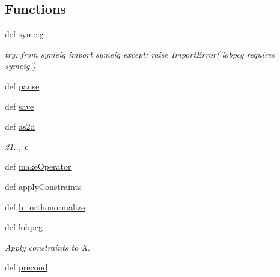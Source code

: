 \subsection*{Functions}
\begin{DoxyCompactItemize}
\item 
def \hyperlink{namespacescipy_1_1sparse_1_1linalg_1_1eigen_1_1lobpcg_1_1lobpcg_aa183ec0063fd295253ce902985b21e04}{symeig}
\begin{DoxyCompactList}\small\item\em try\+: from symeig import symeig except\+: raise Import\+Error('lobpcg requires symeig') \end{DoxyCompactList}\item 
def \hyperlink{namespacescipy_1_1sparse_1_1linalg_1_1eigen_1_1lobpcg_1_1lobpcg_aa94b494b714317896c7dcd451e185f98}{pause}
\item 
def \hyperlink{namespacescipy_1_1sparse_1_1linalg_1_1eigen_1_1lobpcg_1_1lobpcg_a2b392ed8ad37e2dc359ed5c0aa8c98e8}{save}
\item 
def \hyperlink{namespacescipy_1_1sparse_1_1linalg_1_1eigen_1_1lobpcg_1_1lobpcg_a223dbb069e4a2545d5b80d926d32550e}{as2d}
\begin{DoxyCompactList}\small\item\em 21.., c \end{DoxyCompactList}\item 
def \hyperlink{namespacescipy_1_1sparse_1_1linalg_1_1eigen_1_1lobpcg_1_1lobpcg_a0647bc0e18f1bdbb0ce836d3c0128c27}{make\+Operator}
\item 
def \hyperlink{namespacescipy_1_1sparse_1_1linalg_1_1eigen_1_1lobpcg_1_1lobpcg_af8c649e330565d6b550a2630a685e922}{apply\+Constraints}
\item 
def \hyperlink{namespacescipy_1_1sparse_1_1linalg_1_1eigen_1_1lobpcg_1_1lobpcg_a91ae4d05cf848405823c5a31e076a740}{b\+\_\+orthonormalize}
\item 
def \hyperlink{namespacescipy_1_1sparse_1_1linalg_1_1eigen_1_1lobpcg_1_1lobpcg_a07eb016602225854788a18521e1a414f}{lobpcg}
\begin{DoxyCompactList}\small\item\em Apply constraints to X. \end{DoxyCompactList}\item 
def \hyperlink{namespacescipy_1_1sparse_1_1linalg_1_1eigen_1_1lobpcg_1_1lobpcg_a6e978f3841f96576a3b5e62657e92ec0}{precond}
\end{DoxyCompactItemize}
